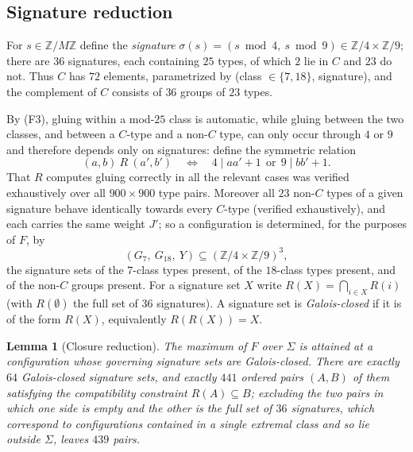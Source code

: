 \documentclass[11pt,a4paper]{article}
\theoremstyle{plain}
\newtheorem{lemma}[theorem]{Lemma}
\theoremstyle{definition}
\theoremstyle{remark}
\newcommand{\Z}{\mathbb{Z}}
\begin{document}
\subsection{Signature reduction}

For $s\in\Z/M\Z$ define the \emph{signature} $\sigma(s)=(s\bmod 4,\ s\bmod 9)\in\Z/4\times\Z/9$; there
are $36$ signatures, each containing $25$ types, of which $2$ lie in $C$ and $23$ do not. Thus $C$ has
$72$ elements, parametrized by (class $\in\{7,18\}$, signature), and the complement of $C$ consists of
$36$ groups of $23$ types.

By (F3), gluing within a mod-$25$ class is automatic, while gluing between the two classes, and between
a $C$-type and a non-$C$ type, can only occur through $4$ or $9$ and therefore depends only on
signatures: define the symmetric relation
\[
 (a,b)\ R\ (a',b')\quad\Longleftrightarrow\quad 4\mid aa'+1\ \ \text{or}\ \ 9\mid bb'+1 .
\]
That $R$ computes gluing correctly in all the relevant cases was verified exhaustively over all
$900\times 900$ type pairs. Moreover all $23$ non-$C$ types of a given signature behave identically
towards every $C$-type (verified exhaustively), and each carries the same weight $J'$; so a
configuration is determined, for the purposes of $F$, by
\[
 (G_7,\ G_{18},\ Y)\subseteq (\Z/4\times\Z/9)^3,
\]
the signature sets of the $7$-class types present, of the $18$-class types present, and of the non-$C$
groups present. For a signature set $X$ write $R(X)=\bigcap_{i\in X}R(i)$ (with $R(\emptyset)$ the full
set of $36$ signatures). A signature set is \emph{Galois-closed} if it is of the form $R(X)$,
equivalently $R(R(X))=X$.

\begin{lemma}[Closure reduction]\label{lem:closure}
The maximum of $F$ over $\Sigma$ is attained at a configuration whose governing signature sets are
Galois-closed. There are exactly $64$ Galois-closed signature sets, and exactly $441$ ordered pairs
$(A,B)$ of them satisfying the compatibility constraint $R(A)\subseteq B$; excluding the two pairs
in which one side is empty and the other is the full set of $36$ signatures, which correspond to
configurations contained in a single extremal class and so lie outside $\Sigma$, leaves $439$ pairs.
\end{lemma}
\end{document}
